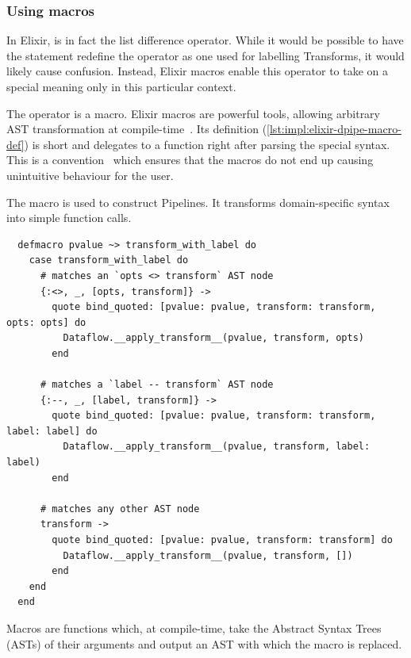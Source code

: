 \subsubsection{Using macros}

In Elixir, \exs{--} is in fact the list difference operator.
While it would be possible to have the  statement redefine the \exs{--} operator as one used for labelling Transforms, it would likely cause confusion.
Instead, Elixir macros enable this operator to take on a special meaning only in this particular context.

The \exs{~>} operator is a macro.
Elixir macros are powerful tools, allowing arbitrary AST transformation at compile-time~\cite[p.~13]{Elixir-Metaprogramming}.
Its definition (\cref{lst:impl:elixir-dpipe-macro-def}) is short and delegates to a function right after parsing the special syntax.
This is a convention~\cite[p.~7]{Elixir-Metaprogramming} which ensures that the macros do not end up causing unintuitive behaviour for the user.

\begin{listing}[h]
	\caption[The definition of the \exs{~>} macro for constructing Pipelines.]{The \exs{~>} macro is used to construct Pipelines. It transforms domain-specific syntax into simple function calls.}
	\label{lst:impl:elixir-dpipe-macro-def}
	\begin{verbatim}
  defmacro pvalue ~> transform_with_label do
    case transform_with_label do
      # matches an `opts <> transform` AST node
      {:<>, _, [opts, transform]} ->
        quote bind_quoted: [pvalue: pvalue, transform: transform, opts: opts] do
          Dataflow.__apply_transform__(pvalue, transform, opts)
        end
        
      # matches a `label -- transform` AST node
      {:--, _, [label, transform]} ->
        quote bind_quoted: [pvalue: pvalue, transform: transform, label: label] do
          Dataflow.__apply_transform__(pvalue, transform, label: label)
        end
      
      # matches any other AST node
      transform ->
        quote bind_quoted: [pvalue: pvalue, transform: transform] do
          Dataflow.__apply_transform__(pvalue, transform, [])
        end
    end
  end
	\end{verbatim}
\end{listing}

Macros are functions which, at compile-time, take the Abstract Syntax Trees (ASTs) of their arguments and output an AST with which the macro is replaced.

